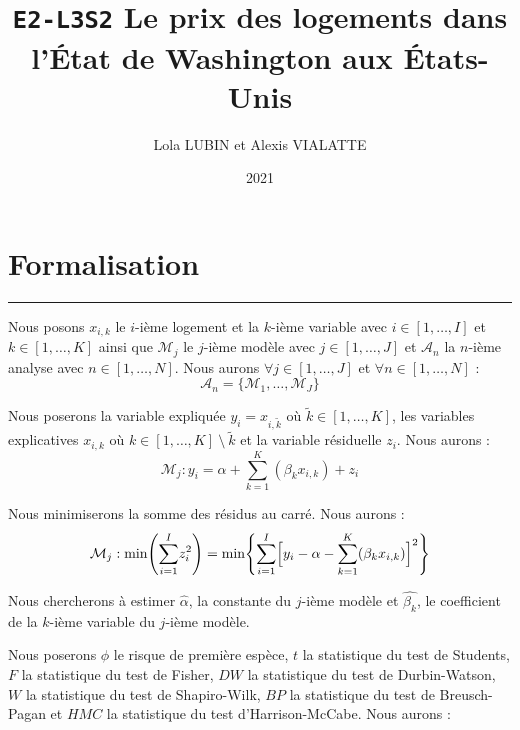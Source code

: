 \documentclass[
  11pt,
  french,
]{article}
\title{\texttt{E2-L3S2} Le prix des logements dans l'État de Washington aux
États-Unis}
\author{Lola LUBIN et Alexis VIALATTE}
\date{2021}
\begin{document}
\maketitle

{
\setcounter{tocdepth}{3}
\tableofcontents
}
\newpage

\hypertarget{formalisation}{%
\section{Formalisation}\label{formalisation}}

\begin{center}\rule{0.5\linewidth}{0.5pt}\end{center}

Nous posons \(x_{i,k}\) le \(i\text{-ième}\) logement et la
\(k\text{-ième}\) variable avec \(i \in [1,\ldots,I]\) et
\(k \in [1,\ldots,K]\) ainsi que \(\mathcal{M}_{j}\) le
\(j\text{-ième}\) modèle avec \(j \in [1,\ldots,J]\) et
\(\mathcal{A}_{n}\) la \(n\text{-ième}\) analyse avec
\(n \in [1,\ldots,N]\). Nous aurons \(\forall j \in [1,\ldots,J]\) et
\(\forall n \in [1,\ldots,N]\) :
\[\mathcal{A}_{n}=\{\mathcal{M}_{1},\ldots,\mathcal{M}_{J}\}\]

Nous poserons la variable expliquée \(y_{i}=x_{i,\tilde{k}}\) où
\(\tilde{k} \in [1,\ldots,K]\), les variables explicatives \(x_{i,k}\)
où \(k \in [1,\ldots,K]\ \setminus\ \tilde{k}\) et la variable
résiduelle \(z_{i}\). Nous aurons : \begin{equation}
  \mathcal{M}_{j}:y_{i}=\alpha+\underset{k=1}{\overset{K}{\sum}}(\beta_{k}x_{i,k})+z_{i}
\end{equation}

Nous minimiserons la somme des résidus au carré. Nous aurons :
\begin{equation}
  \mathcal{M}_{j}:\text{min}\Bigg{(}\underset{i=1}{\overset{I}{\sum}}z_{i}^{2}\Bigg{)}=\text{min}\Bigg\{\underset{i=1}{\overset{I}{\sum}}\Big{[}y_{i}-\alpha-\underset{k=1}{\overset{K}{\sum}}(\beta_{k}x_{i,k})\Big{]}^{2}\Bigg\}
\end{equation}

Nous chercherons à estimer \(\hat{\alpha}\), la constante du
\(j\text{-ième}\) modèle et \(\hat{\beta_{k}}\), le coefficient de la
\(k\text{-ième}\) variable du \(j\text{-ième}\) modèle.

Nous poserons \(\phi\) le risque de première espèce, \(t\) la
statistique du test de Students, \(F\) la statistique du test de Fisher,
\(DW\) la statistique du test de Durbin-Watson, \(W\) la statistique du
test de Shapiro-Wilk, \(BP\) la statistique du test de Breusch-Pagan et
\(HMC\) la statistique du test d'Harrison-McCabe. Nous aurons :
\end{document}
